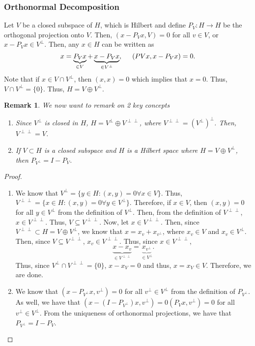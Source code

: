 \documentclass[12pt]{article}
\newtheorem{remark}{Remark}
\newcommand{\sbs}{\subset}
\newcommand{\sse}{\subseteq}
\newcommand{\Vp}{V^{\perp}}
\newcommand{\Vpp}{V^{\perp \perp}}
\begin{document}
\subsubsection*{Orthonormal Decomposition}
\vspace{-20pt}
Let $V$ be a closed subspace of $H$, which is Hilbert and define $P_V: H \to H$ be the orthogonal projection onto $V$. Then, $(x - P_V x, V) = 0$ for all $v \in V$, or $x - P_Vx \in \Vp$. Then, any $x \in H$ can be written as 
\[ x = \underbrace{P_V x}_{\in V} + \underbrace{x - P_V x}_{\in \Vp}, \hspace{5mm} (PV x, x - P_V x) = 0.\]
Note that if $x \in V \cap \Vp$, then $(x, x) = 0$ which implies that $x = 0$. Thus, $V \cap \Vp = \{ 0 \}$. Thus, $H = V \oplus \Vp$. \\
\begin{remark} 
We now want to remark on 2 key concepts
\begin{enumerate}[topsep=-15pt, itemsep=0pt] 
\item Since $\Vp$ is closed in $H$, $H = \Vp \oplus \Vpp$, where $\Vpp = (\Vp)^{\perp}$. Then, $\Vpp = V$. 
\item If $V \sbs H$ is a closed subspace and $H$ is a Hilbert space where $H = V \oplus \Vp$, then $P_{\Vp} = I - P_V$. 
\end{enumerate}
\end{remark}
\vspace{-25pt}
\begin{proof}
\begin{enumerate}
\item We know that $\Vp = \{ y \in H: (x, y) = 0 \forall x \in V\}$. Thus, $\Vpp = \{ x \in H : (x, y) = 0 \forall y \in \Vp \}$. Therefore, if $x \in V$, then $(x, y) = 0$ for all $y \in \Vp$ from the definition of $\Vp$. Then, from the definition of $\Vpp$, $x \in \Vpp$. Thus, $V \sse \Vpp$. Now, let $x \in \Vpp$. Then, since $\Vpp \sbs H = V \oplus \Vp$, we know that $x = x_v + x_{v^{\perp}}$, where $x_v \in V$ and $x_v \in \Vp$. Then, since $V \sse \Vpp$, $x_v \in \Vpp$. Thus, since $x \in \Vpp$, 
\[ \underbrace{x - x_v}_{\in \Vpp} = \underbrace{x_{v^{\perp}}}_{\in \Vp}.\]
Thus, since $\Vp \cap \Vpp = \{ 0 \}$, $x - x_V = 0$ and thus, $x = x_V \in V$. Therefore, we are done. 
\item We know that $(x - P_{\Vp} x, v^{\perp}) = 0$ for all $v^{\perp} \in \Vp$ from the definition of $P_{\Vp}$. As well, we have that $(x -(I - P_{\Vp})x, v^{\perp}) = 0(P_V x, v^{\perp}) = 0$ for all $v^{\perp} \in \Vp$. From the uniqueness of orthonormal projections, we have that $P_{\Vp} = I - P_V$.
\end{enumerate}
\end{proof}
\end{document}
